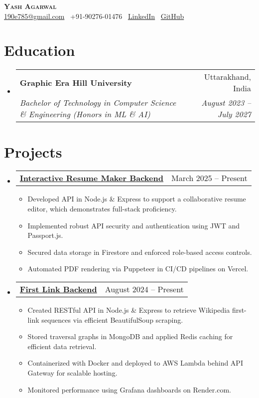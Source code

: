 \documentclass[letterpaper,11pt]{article}
\makeatletter
\newcommand{\resumeItem}[1]{\item\small{#1\vspace{-2pt}}}
\newcommand{\resumeSubheading}[4]{\vspace{-2pt}\item
  \begin{tabular*}{\textwidth}[t]{l@{\extracolsep{\fill}}r}
    \textbf{#1} & #2 \\
    \textit{\small#3} & \textit{\small#4} \\
  \end{tabular*}\vspace{-7pt}}
\newcommand{\resumeProjectHeading}[3]{\vspace{-2pt}\item
  \begin{tabular*}{\textwidth}{l@{\extracolsep{\fill}}r}
    \href{#1}{\textbf{#2}} & {\small #3} \\
  \end{tabular*}\vspace{-5pt}
}
\newcommand{\resumeSubHeadingListStart}{\begin{itemize}[leftmargin=0.15in,label={}]}
\newcommand{\resumeSubHeadingListEnd}{\end{itemize}}
\newcommand{\resumeItemListStart}{\begin{itemize}}
\newcommand{\resumeItemListEnd}{\end{itemize}\vspace{-5pt}}
\makeatother
\begin{document}
\begin{center}
  \textbf{\Huge \scshape Yash Agarwal}\\
  \small
  \href{mailto:190e785@gmail.com}{190e785@gmail.com} \textbar\ +91-90276-01476 \textbar\ 
  \href{https://in.linkedin.com/in/yash-agarwal-190e785}{LinkedIn} \textbar\ 
  \href{https://github.com/190-785}{GitHub}
\end{center}

\section{Education}
\resumeSubHeadingListStart
  \resumeSubheading
    {Graphic Era Hill University}{Uttarakhand, India}
    {Bachelor of Technology in Computer Science \& Engineering (Honors in ML \& AI)}{August 2023 -- July 2027}
\resumeSubHeadingListEnd

\section{Projects}
\resumeSubHeadingListStart

  \resumeProjectHeading
    {https://github.com/190-785/Interactive_Resume_Maker}{Interactive Resume Maker Backend}{March 2025 -- Present}
  \resumeItemListStart
    \resumeItem{Developed API in Node.js \& Express to support a collaborative resume editor, which demonstrates full-stack proficiency.}
    \resumeItem{Implemented robust API security and authentication using JWT and Passport.js.}
    \resumeItem{Secured data storage in Firestore and enforced role-based access controls.}
    \resumeItem{Automated PDF rendering via Puppeteer in CI/CD pipelines on Vercel.}
  \resumeItemListEnd

  \resumeProjectHeading
    {https://github.com/190-785/First_Link_Backend}{First Link Backend}{August 2024 -- Present}
  \resumeItemListStart
    \resumeItem{Created RESTful API in Node.js \& Express to retrieve Wikipedia first-link sequences via efficient BeautifulSoup scraping.}
    \resumeItem{Stored traversal graphs in MongoDB and applied Redis caching for efficient data retrieval.}
    \resumeItem{Containerized with Docker and deployed to AWS Lambda behind API Gateway for scalable hosting.}
    \resumeItem{Monitored performance using Grafana dashboards on Render.com.}
  \resumeItemListEnd

\resumeSubHeadingListEnd
\end{document}

